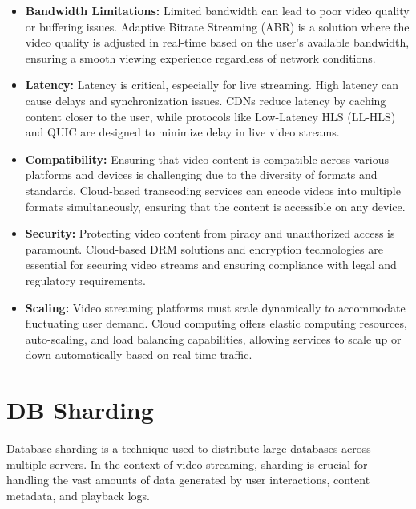 \begin{itemize}
    \item \textbf{Bandwidth Limitations:} Limited bandwidth can lead to poor video quality or buffering issues. Adaptive Bitrate Streaming (ABR) is a solution where the video quality is adjusted in real-time based on the user's available bandwidth, ensuring a smooth viewing experience regardless of network conditions\cite{adaptive_bitrate_video}.
    
    \item \textbf{Latency:} Latency is critical, especially for live streaming. High latency can cause delays and synchronization issues. CDNs reduce latency by caching content closer to the user, while protocols like Low-Latency HLS (LL-HLS) and QUIC are designed to minimize delay in live video streams\cite{latency_video}.
    
    \item \textbf{Compatibility:} Ensuring that video content is compatible across various platforms and devices is challenging due to the diversity of formats and standards. Cloud-based transcoding services can encode videos into multiple formats simultaneously, ensuring that the content is accessible on any device\cite{compatibility_video}.
    
    \item \textbf{Security:} Protecting video content from piracy and unauthorized access is paramount. Cloud-based DRM solutions and encryption technologies are essential for securing video streams and ensuring compliance with legal and regulatory requirements\cite{security_video}.
    
    \item \textbf{Scaling:} Video streaming platforms must scale dynamically to accommodate fluctuating user demand. Cloud computing offers elastic computing resources, auto-scaling, and load balancing capabilities, allowing services to scale up or down automatically based on real-time traffic\cite{scaling_cloud_video}.
\end{itemize}

\section{DB Sharding}
Database sharding is a technique used to distribute large databases across multiple servers. In the context of video streaming, sharding is crucial for handling the vast amounts of data generated by user interactions, content metadata, and playback logs.

